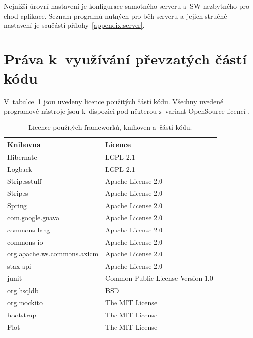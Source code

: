 \documentclass[11pt, final, oneside]{fithesis2}
\begin{document}
Nejnižší úrovní nastavení je konfigurace samotného serveru a~SW nezbytného pro chod aplikace. Seznam programů nutných pro běh serveru a~jejich stručné nastavení je součástí přílohy~\ref{appendix:server}.

\section{Práva k~využívání převzatých částí kódu}
V~tabulce~\ref{tab:libraries:license} jsou uvedeny licence použitých částí kódu.
Všechny uvedené programové nástroje jsou k~dispozici pod některou z~variant OpenSource licencí \cite{Licence}.

\begin{table}[ht] 
\centering
\begin{tabular}{l l}
\hline 
Knihovna & Licence \\
\hline \hline
Hibernate 									& LGPL 2.1 \\
Logback 										& LGPL 2.1 \\
Stripesstuff 								& Apache License 2.0 \\ 
Stripes 										& Apache License 2.0 \\ 
Spring 											& Apache License 2.0 \\ 
com.google.guava 						& Apache License 2.0 \\
commons-lang 								& Apache License 2.0 \\
commons-io 									& Apache License 2.0 \\
org.apache.ws.commons.axiom & Apache License 2.0 \\
stax-api 										& Apache License 2.0 \\
junit 											& Common Public License Version 1.0 \\
org.hsqldb 									& BSD \\
org.mockito 								& The MIT License \\
bootstrap 									& The MIT License \\
Flot 												& The MIT License \\

\hline %
\end{tabular} 
\caption{Licence použitých frameworků, knihoven a~částí kódu.}
\label{tab:libraries:license} %
\end{table} 
\end{document}

